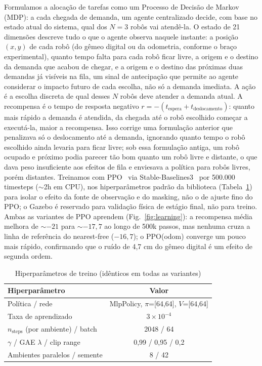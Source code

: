 \documentclass[conference]{IEEEtran}
\begin{document}
Formulamos a alocação de tarefas como um Processo de Decisão de Markov (MDP): a cada chegada de demanda, um agente centralizado decide, com base no estado atual do sistema, qual dos $N=3$ robôs vai atendê-la. O estado de 21 dimensões descreve tudo o que o agente observa naquele instante: a posição $(x,y)$ de cada robô (do gêmeo digital ou da odometria, conforme o braço experimental), quanto tempo falta para cada robô ficar livre, a origem e o destino da demanda que acabou de chegar, e a origem e o destino das próximas duas demandas já visíveis na fila, um sinal de antecipação que permite ao agente considerar o impacto futuro de cada escolha, não só a demanda imediata. A ação é a escolha discreta de qual desses $N$ robôs deve atender a demanda atual. A recompensa é o tempo de resposta negativo $r = -(t_{\text{espera}} + t_{\text{deslocamento}})$: quanto mais rápido a demanda é atendida, da chegada até o robô escolhido começar a executá-la, maior a recompensa. Isso corrige uma formulação anterior que penalizava só o deslocamento até a demanda, ignorando quanto tempo o robô escolhido ainda levaria para ficar livre; sob essa formulação antiga, um robô ocupado e próximo podia parecer tão bom quanto um robô livre e distante, o que dava peso insuficiente aos efeitos de fila e enviesava a política para robôs livres, porém distantes. Treinamos com PPO~\cite{schulman2017proximal} via Stable-Baselines3~\cite{stable-baselines3} por 500.000 timesteps ($\sim$2h em CPU), nos hiperparâmetros padrão da biblioteca (Tabela~\ref{tab:hparams}) para isolar o efeito da fonte de observação e do masking, não o de ajuste fino do PPO; o Gazebo é reservado para validação física de estágio final, não para treino. Ambas as variantes de PPO aprendem (Fig.~\ref{fig:learning}): a recompensa média melhora de $\sim{-21}$ para $\sim{-17{,}7}$ ao longo de 500k passos, mas nenhuma cruza a linha de referência do nearest-free ($-16,7$); o PPO(odom) converge um pouco mais rápido, confirmando que o ruído de 4,7 cm do gêmeo digital é um efeito de segunda ordem.

\begin{table}[htbp]
\caption{Hiperparâmetros de treino (idênticos em todas as variantes)}
\begin{center}
\begin{tabular}{|l|c|}
\hline
\textbf{Hiperparâmetro} & \textbf{Valor} \\
\hline
Política / rede & MlpPolicy, $\pi$=[64,64], $V$=[64,64] \\
\hline
Taxa de aprendizado & $3\times10^{-4}$ \\
\hline
$n_{\text{steps}}$ (por ambiente) / batch & 2048 / 64 \\
\hline
$\gamma$ / GAE $\lambda$ / clip range & 0,99 / 0,95 / 0,2 \\
\hline
Ambientes paralelos / semente & 8 / 42 \\
\hline
\end{tabular}
\label{tab:hparams}
\end{center}
\end{table}
\end{document}
